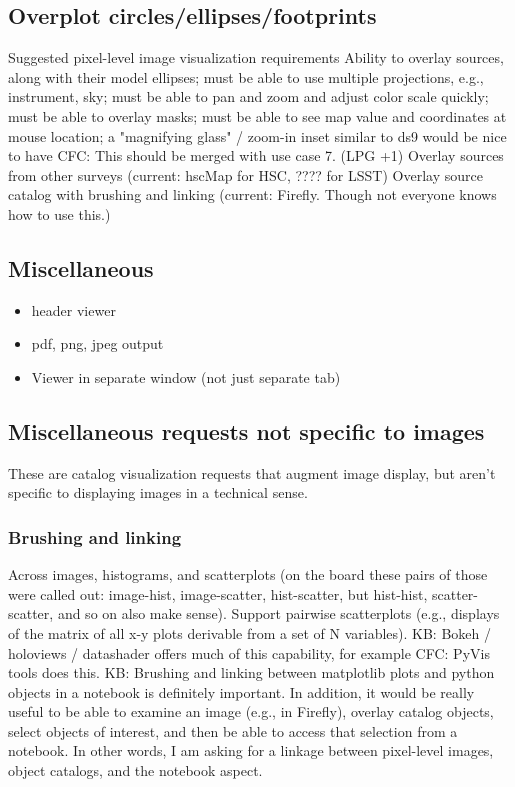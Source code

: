 \subsection{Overplot circles/ellipses/footprints}
Suggested pixel-level image visualization requirements
Ability to overlay sources, along with their model ellipses; must be able to use multiple projections, e.g., instrument, sky; must be able to pan and zoom and adjust color scale quickly; must be able to overlay masks; must be able to see map value and coordinates at mouse location; a "magnifying glass" / zoom-in inset similar to ds9 would be nice to have
CFC: This should be merged with use case 7. (LPG +1)
Overlay sources from other surveys   (current: hscMap for HSC, ????  for LSST)
Overlay source catalog with brushing and linking   (current: Firefly. Though not everyone knows how to use this.)

\subsection{Miscellaneous}
\begin{itemize}
\item{header viewer}
\item{pdf, png, jpeg output}
\item{Viewer in separate window (not just separate tab)}
\end{itemize}

\subsection{Miscellaneous requests not specific to images}
These are catalog visualization requests that augment image display, but aren't specific to displaying images in a technical sense.

\subsubsection{Brushing and linking}
Across images, histograms, and scatterplots (on the board these pairs of those were called out: image-hist, image-scatter, hist-scatter, but hist-hist, scatter-scatter, and so on also make sense). Support pairwise scatterplots (e.g., displays of the matrix of all x-y plots derivable from a set of N variables).
KB: Bokeh / holoviews / datashader offers much of this capability, for example
CFC: PyVis tools does this.
KB: Brushing and linking between matplotlib plots and python objects in a notebook is definitely important. In addition, it would be really useful to be able to examine an image (e.g., in Firefly), overlay catalog objects, select objects of interest, and then be able to access that selection from a notebook. In other words, I am asking for a linkage between pixel-level images, object catalogs, and the notebook aspect.

